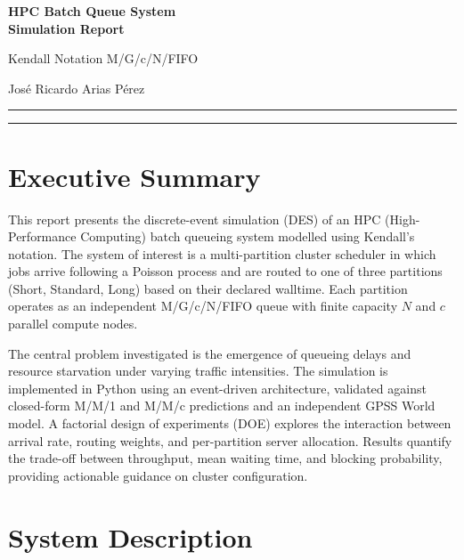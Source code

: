 \documentclass[11pt,a4paper]{article}
\begin{document}
\begin{titlepage}
  \centering
  \vspace*{2cm}
  {\LARGE\bfseries HPC Batch Queue System\\[0.4em]Simulation Report\par}
  \vspace{0.4cm}
  {\large Kendall Notation M/G/c/N/FIFO\par}  \vspace{1cm}
  {\large José Ricardo Arias Pérez\par}
  \vspace{3cm}
  \rule{\linewidth}{0.4pt}
  \vspace{0.5cm}
  \tableofcontents
  \vspace{0.5cm}
  \rule{\linewidth}{0.4pt}
\end{titlepage}

\section{Executive Summary}

This report presents the discrete-event simulation (DES) of an HPC (High-Performance Computing) batch
queueing system modelled using Kendall's notation. The system of interest is a multi-partition cluster
scheduler in which jobs arrive following a Poisson process and are routed to one of three partitions
(Short, Standard, Long) based on their declared walltime. Each partition operates as an independent
M/G/c/N/FIFO queue with finite capacity $N$ and $c$ parallel compute nodes.

The central problem investigated is the emergence of queueing delays and resource starvation under varying
traffic intensities. The simulation is implemented in Python using an event-driven architecture, validated
against closed-form M/M/1 and M/M/c predictions and an independent GPSS World model. A factorial design
of experiments (DOE) explores the interaction between arrival rate, routing weights, and per-partition
server allocation. Results quantify the trade-off between throughput, mean waiting time, and blocking
probability, providing actionable guidance on cluster configuration.

\section{System Description}
\end{document}
